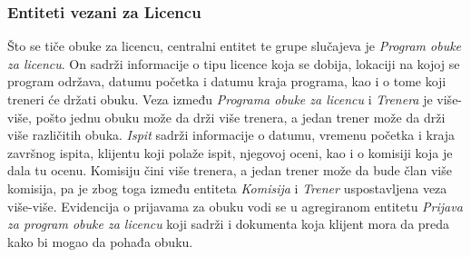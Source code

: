 \documentclass[../main.tex]{subfiles}
\begin{document}
\subsubsection{Entiteti vezani za Licencu}
Što se tiče obuke za licencu, centralni entitet te grupe slučajeva je \textit{Program obuke za licencu}. On sadrži informacije o tipu licence koja se dobija, lokaciji na kojoj se program održava, datumu početka i datumu kraja programa, kao i o tome koji treneri će držati obuku. Veza između \textit{Programa obuke za licencu} i \textit{Trenera} je više-više, pošto jednu obuku može da drži više trenera, a jedan trener može da drži više različitih obuka. \textit{Ispit} sadrži informacije o datumu, vremenu početka i kraja završnog ispita, klijentu koji polaže ispit, njegovoj oceni, kao i o komisiji koja je dala tu ocenu. Komisiju čini više trenera, a jedan trener može da bude član više komisija, pa je zbog toga između entiteta \textit{Komisija} i \textit{Trener} uspostavljena veza više-više. Evidencija o prijavama za obuku vodi se u agregiranom entitetu \textit{Prijava za program obuke za licencu} koji sadrži i dokumenta koja klijent mora da preda kako bi mogao da pohađa obuku.
\end{document}
